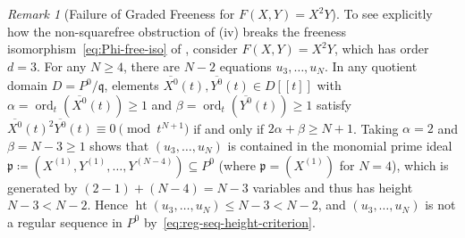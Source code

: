 \documentclass[a4paper, 12pt, reqno]{amsart}
\theoremstyle{remark}
\newtheorem{remark}[theorem]{Remark}
\begin{document}
\begin{remark}[Failure of Graded Freeness for $F(X, Y) = X^2 Y$]
  \label{rmk:obstruction-non-squarefree}
  To see explicitly how the non-squarefree obstruction of (iv) breaks the freeness isomorphism~\eqref{eq:Phi-free-iso} of ,
  consider $F(X, Y) = X^2 Y$,
  which has order $d = 3$.
  For any $N \ge 4$,
  there are $N - 2$ equations $u_3, \dots, u_N$.
  In any quotient domain $D = P^0 / \mathfrak{q}$,
  elements $\overline{X^0}(t), \overline{Y^0}(t) \in D[[t]]$ with $\alpha = \operatorname{ord}_t(\overline{X^0}(t)) \ge 1$ and $\beta = \operatorname{ord}_t(\overline{Y^0}(t)) \ge 1$
  satisfy $\overline{X^0}(t)^2 \overline{Y^0}(t) \equiv 0 \pmod{t^{N + 1}}$ if and only if $2\alpha + \beta \ge N + 1$.
  Taking $\alpha = 2$ and $\beta = N - 3 \ge 1$ shows that $(u_3, \dots, u_N)$ is contained in the monomial prime ideal $\mathfrak{p} \coloneq (X^{(1)}, Y^{(1)}, \dots, Y^{(N - 4)}) \subseteq P^0$
  (where $\mathfrak{p} = (X^{(1)})$ for $N = 4$),
  which is generated by $(2 - 1) + (N - 4) = N - 3$ variables and thus has height $N - 3 < N - 2$.
  Hence $\operatorname{ht}(u_3, \dots, u_N) \le N - 3 < N - 2$,
  and $(u_3, \dots, u_N)$ is not a regular sequence in $P^0$ by~\eqref{eq:reg-seq-height-criterion}.


\end{remark}
\end{document}
